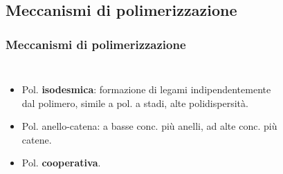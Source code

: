 \subsection{Meccanismi di polimerizzazione}\begin{frame}\frametitle{Meccanismi di polimerizzazione}
 \begin{columns}
\begin{itemize}
                       \item Pol. \textbf{isodesmica}: formazione di legami indipendentemente dal polimero, simile a pol. a stadi, alte polidispersità.
                       \item Pol. anello-catena: a basse conc. più anelli, ad alte conc. più catene.
                       \item Pol. \textbf{cooperativa}.
                       \end{itemize}
\vspace{-15pt}\begin{figure}{}\end{figure}\end{columns}
\end{frame}



